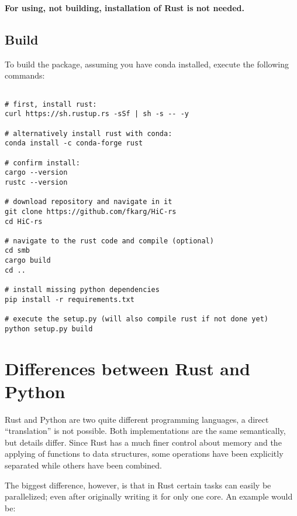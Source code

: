 \textbf{For using, not building, installation of Rust is not needed.}


\subsection{Build}\label{sec:build}

To build the package, assuming you have conda installed, execute the following
commands:

\begin{verbatim}

# first, install rust:
curl https://sh.rustup.rs -sSf | sh -s -- -y

# alternatively install rust with conda:
conda install -c conda-forge rust

# confirm install:
cargo --version
rustc --version

# download repository and navigate in it
git clone https://github.com/fkarg/HiC-rs
cd HiC-rs

# navigate to the rust code and compile (optional)
cd smb
cargo build
cd ..

# install missing python dependencies
pip install -r requirements.txt

# execute the setup.py (will also compile rust if not done yet)
python setup.py build

\end{verbatim}









\newpage
\section{Differences between Rust and Python}\label{sec:differences}

Rust and Python are two quite different programming languages, a direct
``translation'' is not possible. Both implementations are the same semantically,
but details differ. Since Rust has a much finer control about memory and the
applying of functions to data structures, some operations have been explicitly
separated while others have been combined.

The biggest difference, however, is that in Rust certain tasks can easily be
parallelized; even after originally writing it for only one core. An example
would be:

